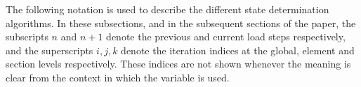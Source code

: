 The following notation is used to describe the different state determination algorithms. In these subsections, and in the subsequent sections of the paper, the subscripts $n$ and $n+1$ denote the previous and current load steps respectively, and the superscripts $i, j, k$ denote the iteration indices at the global, element and section levels respectively. These indices are not shown whenever the meaning is clear from the context in which the variable is used.